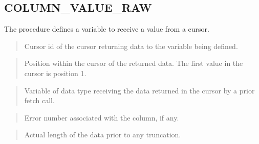 \documentclass[letterpaper,10pt,english,openany,oneside]{sphinxmanual}
\begin{document}
\newpage


\subsection{COLUMN\_VALUE\_RAW}
\label{\detokenize{column_value_raw:column-value-raw}}\label{\detokenize{column_value_raw::doc}}
The  procedure defines a variable to receive a 
value from a cursor.

\begin{quote}

\end{quote}


\begin{quote}

Cursor id of the cursor returning data to the variable being defined.
\end{quote}

\begin{quote}

Position within the cursor of the returned data. The first value in the
cursor is position 1.
\end{quote}

\begin{quote}

Variable of data type  receiving the data returned in the cursor by a
prior fetch call.
\end{quote}

\begin{quote}

Error number associated with the column, if any.
\end{quote}

\begin{quote}

Actual length of the data prior to any truncation.
\end{quote}
\end{document}
